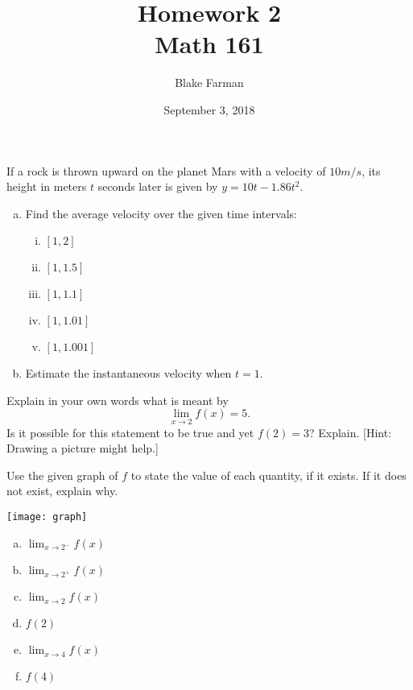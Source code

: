 \documentclass[10pt]{amsart}
\title[Homework 2]{Homework 2\\Math 161}
\date{September 3, 2018}
\author{Blake Farman}
\begin{document}
\maketitle

\makenameslot

\begin{thm}
  If a rock is thrown upward on the planet Mars with a velocity of \(10 m/s\), its height in meters \(t\) seconds later is given by \(y = 10t - 1.86t^2\).
  \begin{enumerate}[(a)]
  \item
    Find the average velocity over the given time intervals:
    \begin{enumerate}[(i)]
    \item
      \([1,2]\)
      \vspace{1in}
    \item
      \([1,1.5]\)
      \vspace{1in}
    \item
      \([1,1.1]\)
      \vspace{1in}
    \item
      \([1,1.01]\)
      \newpage
    \item
      \([1,1.001]\)
      \vspace{1in}
    \end{enumerate}
  \item
    Estimate the instantaneous velocity when \(t = 1\).
    \vspace{1in}
  \end{enumerate}
\end{thm}

\begin{thm}
  Explain in your own words what is meant by
  \[\lim_{x \to 2} f(x) = 5.\]
  Is it possible for this statement to be true and yet \(f(2) = 3\)?
  Explain.
  {[Hint: Drawing a picture might help.]}
\end{thm}

\vspace{2in}

\begin{thm}
  Use the given graph of \(f\) to state the value of each quantity, if it exists.
  If it does not exist, explain why.
  \begin{center}
    \texttt{[image: graph]}
  \end{center}
  \newpage
  \begin{enumerate}[(a)]
  \item
    \(\lim_{x \to 2^{-}} f(x)\)
    \vspace{1in}
  \item
    \(\lim_{x \to 2^{+}} f(x)\)
    \vspace{1in}
  \item
    \(\lim_{x \to 2} f(x)\)
    \vspace{1in}
  \item
    \(f(2)\)
    \vspace{1in}
  \item
    \(\lim_{x \to 4} f(x)\)
    \vspace{1in}
  \item
    \(f(4)\)
    \vspace{1in}
  \end{enumerate}
\end{thm}
\end{document}
